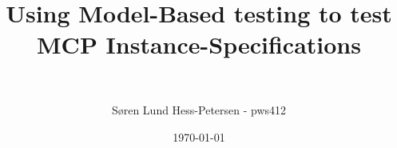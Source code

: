\documentclass[a4paper,11pt,oneside]{memoir}
\begin{document}

\thesiscomment{} %
\title{Using Model-Based testing to test MCP Instance-Specifications}
\subtitle{~} %
\author{Søren Lund Hess-Petersen - pws412}
\date{\today} %

\pagestyle{plain}
\maketitle

\cleardoublepage
{}
\setcounter{page}{3}

\cleardoublepage
\pagestyle{plain}

\begin{abstract}
\end{abstract}

\begin{resume}
\end{resume}



\cleardoublepage
{}
\tableofcontents*

\cleardoublepage
{}
\setcounter{page}{1}











\end{document}
